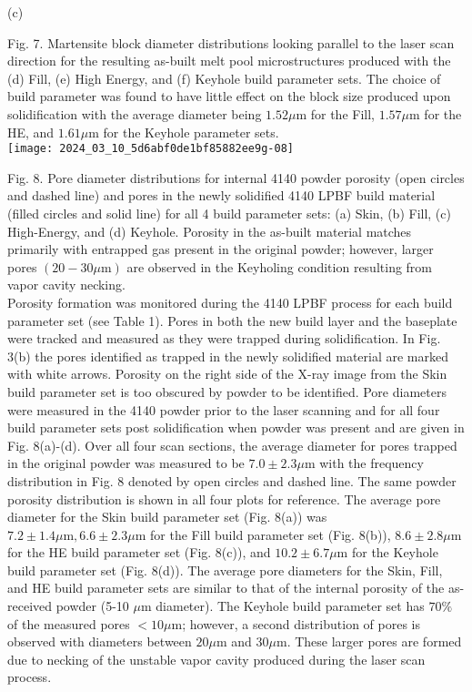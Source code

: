 \documentclass[10pt]{article}
\begin{document}
(c)

Fig. 7. Martensite block diameter distributions looking parallel to the laser scan direction for the resulting as-built melt pool microstructures produced with the (d) Fill, (e) High Energy, and (f) Keyhole build parameter sets. The choice of build parameter was found to have little effect on the block size produced upon solidification with the average diameter being $1.52 \mu \mathrm{m}$ for the Fill, $1.57 \mu \mathrm{m}$ for the HE, and $1.61 \mu \mathrm{m}$ for the Keyhole parameter sets.\\
\texttt{[image: 2024\_03\_10\_5d6abf0de1bf85882ee9g-08]}

Fig. 8. Pore diameter distributions for internal 4140 powder porosity (open circles and dashed line) and pores in the newly solidified 4140 LPBF build material (filled circles and solid line) for all 4 build parameter sets: (a) Skin, (b) Fill, (c) High-Energy, and (d) Keyhole. Porosity in the as-built material matches primarily with entrapped gas present in the original powder; however, larger pores $(20-30 \mu \mathrm{m})$ are observed in the Keyholing condition resulting from vapor cavity necking.\\
Porosity formation was monitored during the 4140 LPBF process for each build parameter set (see Table 1). Pores in both the new build layer and the baseplate were tracked and measured as they were trapped during solidification. In Fig. 3(b) the pores identified as trapped in the newly solidified material are marked with white arrows. Porosity on the right side of the X-ray image from the Skin build parameter set is too obscured by powder to be identified. Pore diameters were measured in the 4140 powder prior to the laser scanning and for all four build parameter sets post solidification when powder was present and are given in Fig. 8(a)-(d). Over all four scan sections, the average diameter for pores trapped in the original powder was measured to be $7.0 \pm 2.3 \mu \mathrm{m}$ with the frequency distribution in Fig. 8 denoted by open circles and dashed line. The same powder porosity distribution is shown in all four plots for reference. The average pore diameter for the Skin build parameter set (Fig. 8(a)) was $7.2 \pm 1.4 \mu \mathrm{m}, 6.6 \pm 2.3 \mu \mathrm{m}$ for the Fill build parameter set (Fig. 8(b)), $8.6 \pm 2.8 \mu \mathrm{m}$ for the HE build parameter set (Fig. 8(c)), and $10.2 \pm 6.7 \mu \mathrm{m}$ for the Keyhole build parameter set (Fig. 8(d)). The average pore diameters for the Skin, Fill, and HE build parameter sets are similar to that of the internal porosity of the as-received powder (5-10 $\mu \mathrm{m}$ diameter). The Keyhole build parameter set has $70 \%$ of the measured pores $<10 \mu \mathrm{m}$; however, a second distribution of pores is observed with diameters between $20 \mu \mathrm{m}$ and $30 \mu \mathrm{m}$. These larger pores are formed due to necking of the unstable vapor cavity produced during the laser scan process.
\end{document}
